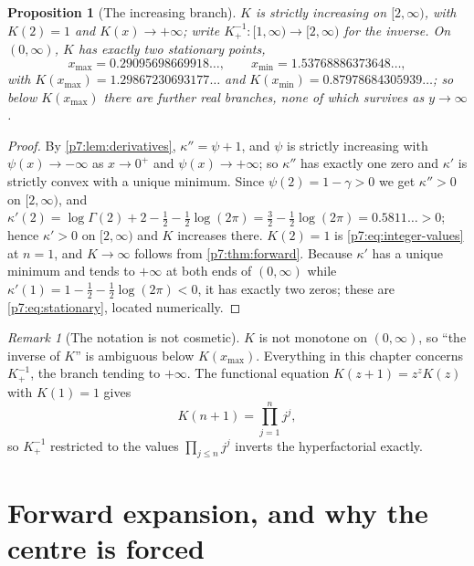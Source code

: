 \documentclass[11pt,a4paper,oneside]{book}
\theoremstyle{plain}
\newtheorem{proposition}[theorem]{Proposition}
\theoremstyle{definition}
\theoremstyle{remark}
\newtheorem{remark}[theorem]{Remark}
\begin{document}
\begin{proposition}[The increasing branch]\label{p7:prop:branch}
$K$ is strictly increasing on $[2,\infty)$, with $K(2)=1$ and
$K(x)\to+\infty$; write $K_+^{-1}:[1,\infty)\to[2,\infty)$ for the inverse.  On
$(0,\infty)$, $K$ has exactly two stationary points,
\begin{equation}\label{p7:eq:stationary}
 x_{\max}=0.29095698669918\ldots,
 \qquad
 x_{\min}=1.53768886373648\ldots,
\end{equation}
with $K(x_{\max})=1.29867230693177\ldots$ and
$K(x_{\min})=0.87978684305939\ldots$; so below $K(x_{\max})$ there are further
real branches, none of which survives as $y\to\infty$.
\end{proposition}

\begin{proof}
By \cref{p7:lem:derivatives}, $\kappa''=\psi+1$, and $\psi$ is strictly
increasing with $\psi(x)\to-\infty$ as $x\to0^{+}$ and $\psi(x)\to+\infty$;
so $\kappa''$ has exactly one zero and $\kappa'$ is strictly convex with a
unique minimum.  Since $\psi(2)=1-\gamma>0$ we get $\kappa''>0$ on
$[2,\infty)$, and
$\kappa'(2)=\log\Gamma(2)+2-\tfrac12-\tfrac12\log(2\pi)
=\tfrac32-\tfrac12\log(2\pi)=0.5811\ldots>0$; hence $\kappa'>0$ on
$[2,\infty)$ and $K$ increases there.  $K(2)=1$ is
\eqref{p7:eq:integer-values} at $n=1$, and $K\to\infty$ follows from
\cref{p7:thm:forward}.  Because $\kappa'$ has a unique minimum and tends to
$+\infty$ at both ends of $(0,\infty)$ while $\kappa'(1)=1-\tfrac12
-\tfrac12\log(2\pi)<0$, it has exactly two zeros; these are
\eqref{p7:eq:stationary}, located numerically.
\end{proof}

\begin{remark}[The notation is not cosmetic]\label{p7:rem:branches}
$K$ is not monotone on $(0,\infty)$, so ``the inverse of $K$'' is ambiguous
below $K(x_{\max})$.  Everything in this chapter concerns $K_+^{-1}$, the branch
tending to $+\infty$.  The functional equation $K(z+1)=z^{z}K(z)$ with
$K(1)=1$ gives
\begin{equation}\label{p7:eq:integer-values}
 K(n+1)=\prod_{j=1}^{n}j^{j},
\end{equation}
so $K_+^{-1}$ restricted to the values $\prod_{j\le n}j^{j}$ inverts the
hyperfactorial exactly.
\end{remark}

\section{Forward expansion, and why the centre is forced}
\label{p7:sec:forward}
\end{document}
